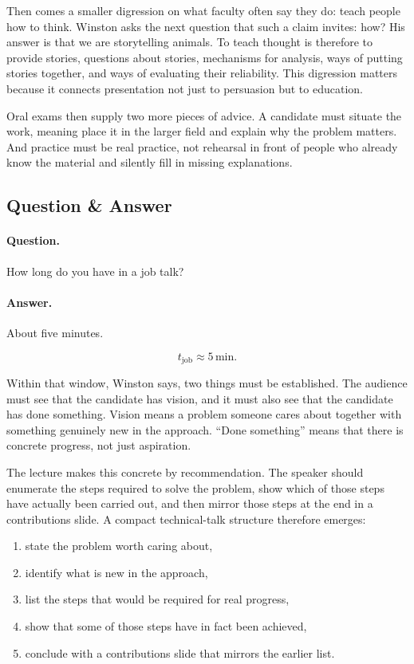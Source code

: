Then comes a smaller digression on what faculty often say they do: teach people how to think. Winston asks the next question that such a claim invites: how? His answer is that we are storytelling animals. To teach thought is therefore to provide stories, questions about stories, mechanisms for analysis, ways of putting stories together, and ways of evaluating their reliability. This digression matters because it connects presentation not just to persuasion but to education.

Oral exams then supply two more pieces of advice. A candidate must situate the work, meaning place it in the larger field and explain why the problem matters. And practice must be real practice, not rehearsal in front of people who already know the material and silently fill in missing explanations.

\subsection{Question \& Answer}

\paragraph{Question.} How long do you have in a job talk?

\paragraph{Answer.} About five minutes.

\begin{equation}
t_{\mathrm{job}} \approx 5\,\mathrm{min}.
\end{equation}

Within that window, Winston says, two things must be established. The audience must see that the candidate has vision, and it must also see that the candidate has done something. Vision means a problem someone cares about together with something genuinely new in the approach. ``Done something'' means that there is concrete progress, not just aspiration.

The lecture makes this concrete by recommendation. The speaker should enumerate the steps required to solve the problem, show which of those steps have actually been carried out, and then mirror those steps at the end in a contributions slide. A compact technical-talk structure therefore emerges:

\begin{enumerate}
\item state the problem worth caring about,
\item identify what is new in the approach,
\item list the steps that would be required for real progress,
\item show that some of those steps have in fact been achieved,
\item conclude with a contributions slide that mirrors the earlier list.
\end{enumerate}

